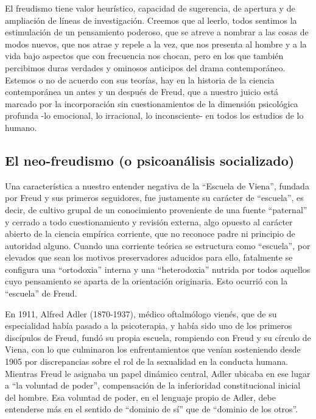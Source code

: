 \documentclass[
]{book}
\begin{document}
El freudismo tiene valor heurístico, capacidad de sugerencia, de apertura y de ampliación de líneas de investigación. Creemos que al leerlo, todos sentimos la estimulación de un pensamiento poderoso, que se atreve a nombrar a las cosas de modos nuevos, que nos atrae y repele a la vez, que nos presenta al hombre y a la vida bajo aspectos que con frecuencia nos chocan, pero en los que también percibimos duras verdades y ominosos anticipos del drama contemporáneo. Estemos o no de acuerdo con sus teorías, hay en la historia de la ciencia contemporánea un antes y un después de Freud, que a nuestro juicio está marcado por la incorporación sin cuestionamientos de la dimensión psicológica profunda -lo emocional, lo irracional, lo inconsciente- en todos los estudios de lo humano.

\hypertarget{el-neo-freudismo-o-psicoanuxe1lisis-socializado}{%
\subsection*{El neo-freudismo (o psicoanálisis socializado)}\label{el-neo-freudismo-o-psicoanuxe1lisis-socializado}}

Una característica a nuestro entender negativa de la ``Escuela de Viena'', fundada por Freud y sus primeros seguidores, fue justamente su carácter de ``escuela'', es decir, de cultivo grupal de un conocimiento proveniente de una fuente ``paternal'' y cerrado a todo cuestionamiento y revisión externa, algo opuesto al carácter abierto de la ciencia empírica corriente, que no reconoce padre ni principio de autoridad alguno. Cuando una corriente teórica se estructura como ``escuela'', por elevados que sean los motivos preservadores aducidos para ello, fatalmente se configura una ``ortodoxia'' interna y una ``heterodoxia'' nutrida por todos aquellos cuyo pensamiento se aparta de la orientación originaria. Esto ocurrió con la ``escuela'' de Freud.

En 1911, Alfred Adler (1870-1937), médico oftalmólogo vienés, que de su especialidad había pasado a la psicoterapia, y había sido uno de los primeros discípulos de Freud, fundó su propia escuela, rompiendo con Freud y su círculo de Viena, con lo que culminaron los enfrentamientos que venían sosteniendo desde 1905 por discrepancias sobre el rol de la sexualidad en la conducta humana. Mientras Freud le asignaba un papel dinámico central, Adler ubicaba en ese lugar a ``la voluntad de poder'', compensación de la inferioridad constitucional inicial del hombre. Esa voluntad de poder, en el lenguaje propio de Adler, debe entenderse más en el sentido de ``dominio de sí'' que de ``dominio de los otros''.
\end{document}
